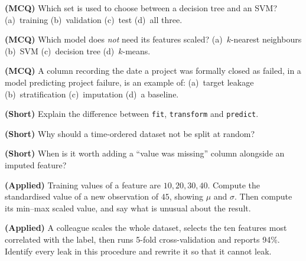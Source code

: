 \begin{reviewq}
  \item \textbf{(MCQ)} Which set is used to choose between a decision tree and an
        SVM? (a)~training (b)~validation (c)~test (d)~all three.
  \item \textbf{(MCQ)} Which model does \emph{not} need its features scaled?
        (a)~$k$-nearest neighbours (b)~SVM (c)~decision tree (d)~$k$-means.
  \item \textbf{(MCQ)} A column recording the date a project was formally closed
        as failed, in a model predicting project failure, is an example of:
        (a)~target leakage (b)~stratification (c)~imputation (d)~a baseline.
  \item \textbf{(Short)} Explain the difference between \texttt{fit},
        \texttt{transform} and \texttt{predict}.
  \item \textbf{(Short)} Why should a time-ordered dataset not be split at random?
  \item \textbf{(Short)} When is it worth adding a ``value was missing'' column
        alongside an imputed feature?
  \item \textbf{(Applied)} Training values of a feature are $10, 20, 30, 40$. Compute
        the standardised value of a new observation of $45$, showing $\mu$ and
        $\sigma$. Then compute its min--max scaled value, and say what is unusual
        about the result.
  \item \textbf{(Applied)} A colleague scales the whole dataset, selects the ten
        features most correlated with the label, then runs 5-fold
        cross-validation and reports 94\%. Identify every leak in this procedure
        and rewrite it so that it cannot leak.
\end{reviewq}
